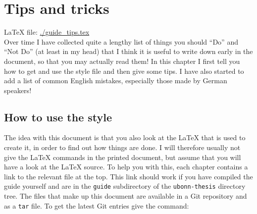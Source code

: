
\chapter{Tips and tricks}
\label{sec:tips}

\LaTeX{} file: \url{./guide_tips.tex}\\[1ex]
\noindent
Over time I have collected quite a lengthy list of things you should
\enquote{Do} and \enquote{Not Do} (at least in my head) that I think
it is useful to write down early in the document, so that you may
actually read them!  In this chapter I first tell you how to get
and use the style file and then give some tips.
I have also started to add a list of common English mistakes,
especially those made by German speakers!

\section{How to use the  style}
\label{sec:tips:howto}

The idea with this document is that you also look at the \LaTeX{} that
is used to create it, in order to find out how things are done.  I
will therefore usually not give the \LaTeX{} commands in the printed
document, but assume that you will have a look at the \LaTeX{} source.
To help you with this, each chapter contains a link to the relevant
file at the top. This link should work if you have compiled the guide
yourself and are in the \texttt{guide} subdirectory of the
\texttt{ubonn-thesis} directory tree.  The files that make up this
document are available in a Git repository and as a
\texttt{tar} file. To get the latest Git entries give the
command:

